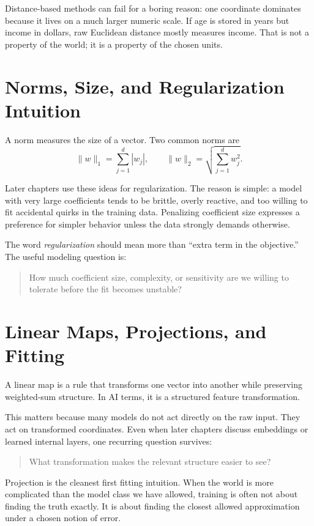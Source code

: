 Distance-based methods can fail for a boring reason: one coordinate dominates because it lives on a much larger numeric scale. If age is stored in years but income in dollars, raw Euclidean distance mostly measures income. That is not a property of the world; it is a property of the chosen units.

\section*{Norms, Size, and Regularization Intuition}

A norm measures the size of a vector. Two common norms are
\[
\|w\|_1 = \sum_{j=1}^{d} |w_j|,
\qquad
\|w\|_2 = \sqrt{\sum_{j=1}^{d} w_j^2}.
\]

Later chapters use these ideas for regularization. The reason is simple: a model with very large coefficients tends to be brittle, overly reactive, and too willing to fit accidental quirks in the training data. Penalizing coefficient size expresses a preference for simpler behavior unless the data strongly demands otherwise.

The word \emph{regularization} should mean more than ``extra term in the objective.'' The useful modeling question is:

\begin{quote}
How much coefficient size, complexity, or sensitivity are we willing to tolerate before the fit becomes unstable?
\end{quote}

\section*{Linear Maps, Projections, and Fitting}

A linear map is a rule that transforms one vector into another while preserving weighted-sum structure. In AI terms, it is a structured feature transformation.

This matters because many models do not act directly on the raw input. They act on transformed coordinates. Even when later chapters discuss embeddings or learned internal layers, one recurring question survives:

\begin{quote}
What transformation makes the relevant structure easier to see?
\end{quote}

Projection is the cleanest first fitting intuition. When the world is more complicated than the model class we have allowed, training is often not about finding the truth exactly. It is about finding the closest allowed approximation under a chosen notion of error.

